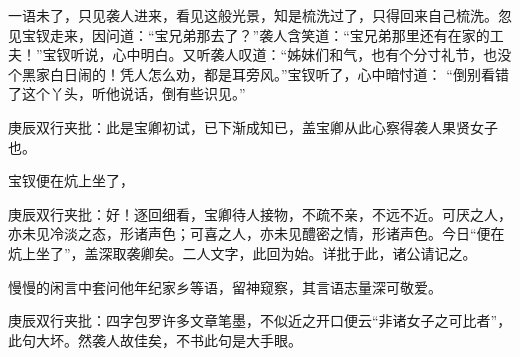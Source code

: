\begin{parag}
\end{parag}


\begin{parag}


    一语未了，只见袭人进来，看见这般光景，知是梳洗过了，只得回来自己梳洗。忽见宝钗走来，因问道：“宝兄弟那去了？”袭人含笑道：“宝兄弟那里还有在家的工夫！”宝钗听说，心中明白。又听袭人叹道：“姊妹们和气，也有个分寸礼节，也没个黑家白日闹的！凭人怎么劝，都是耳旁风。”宝钗听了，心中暗忖道： “倒别看错了这个丫头，听他说话，倒有些识见。”\begin{note}庚辰双行夹批：此是宝卿初试，已下渐成知已，盖宝卿从此心察得袭人果贤女子也。\end{note}宝钗便在炕上坐了，\begin{note}庚辰双行夹批：好！逐回细看，宝卿待人接物，不疏不亲，不远不近。可厌之人，亦未见冷淡之态，形诸声色；可喜之人，亦未见醴密之情，形诸声色。今日“便在炕上坐了”，盖深取袭卿矣。二人文字，此回为始。详批于此，诸公请记之。\end{note}慢慢的闲言中套问他年纪家乡等语，留神窥察，其言语志量深可敬爱。\begin{note}庚辰双行夹批：四字包罗许多文章笔墨，不似近之开口便云“非诸女子之可比者”，此句大坏。然袭人故佳矣，不书此句是大手眼。\end{note}
\end{parag}


